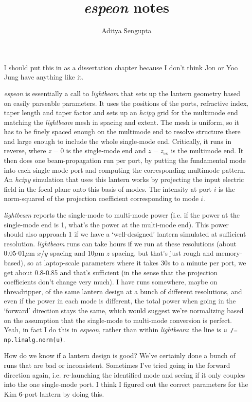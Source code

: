 \documentclass{article}
\title{\textit{espeon} notes}
\author{Aditya Sengupta}
\begin{document}
    \maketitle

    I should put this in as a dissertation chapter because I don't think Jon or Yoo Jung have anything like it.

    \textit{espeon} is essentially a call to \textit{lightbeam} that sets up the lantern geometry based on easily parseable parameters. It uses the positions of the ports, refractive index, taper length and taper factor and sets up an \textit{hcipy} grid for the multimode end matching the \textit{lightbeam} mesh in spacing and extent. The mesh is uniform, so it has to be finely spaced enough on the multimode end to resolve structure there and large enough to include the whole single-mode end. Critically, it runs in reverse, where $z = 0$ is the single-mode end and $z = z_{\text{ex}}$ is the multimode end. It then does one beam-propagation run per port, by putting the fundamental mode into each single-mode port and computing the corresponding multimode pattern. An \textit{hcipy} simulation that uses this lantern works by projecting the input electric field in the focal plane onto this basis of modes. The intensity at port $i$ is the norm-squared of the projection coefficient corresponding to mode $i$.

    \textit{lightbeam} reports the single-mode to multi-mode power (i.e. if the power at the single-mode end is 1, what's the power at the multi-mode end). This power should also approach 1 if we have a `well-designed' lantern simulated at sufficient resolution. \textit{lightbeam} runs can take hours if we run at these resolutions (about 0.05-01$\mu$m $x$/$y$ spacing and 10$\mu$m $z$ spacing, but that's just rough and memory-based), so at laptop-scale parameters where it takes 30s to a minute per port, we get about 0.8-0.85 and that's sufficient (in the sense that the projection coefficients don't change very much). I have runs somewhere, maybe on threadripper, of the same lantern design at a bunch of different resolutions, and even if the power in each mode is different, the total power when going in the `forward' direction stays the same, which would suggest we're normalizing based on the assumption that the single-mode to multi-mode conversion is perfect. Yeah, in fact I do this in \textit{espeon}, rather than within \textit{lightbeam}: the line is \texttt{u /= np.linalg.norm(u)}.

    How do we know if a lantern design is good? We've certainly done a bunch of runs that are bad or inconsistent. Sometimes I've tried going in the forward direction again, i.e. re-launching the identified mode and seeing if it only couples into the one single-mode port. I think I figured out the correct parameters for the Kim 6-port lantern by doing this.
\end{document}
